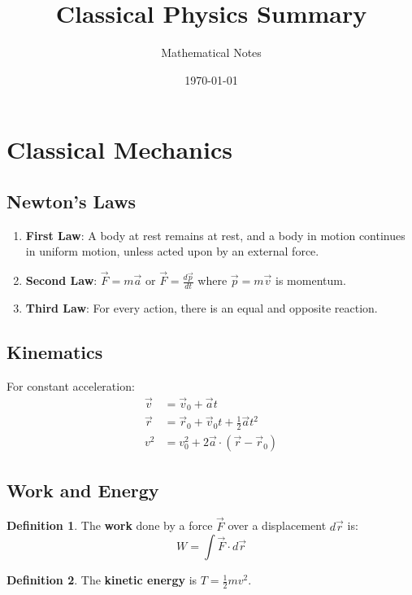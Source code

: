 \documentclass[11pt]{article}
\title{Classical Physics Summary}
\author{Mathematical Notes}
\date{\today}
\theoremstyle{definition}
\newtheorem{definition}{Definition}[section]
\begin{document}
\maketitle

\tableofcontents
\newpage

\section{Classical Mechanics}

\subsection{Newton's Laws}
\begin{enumerate}
    \item \textbf{First Law}: A body at rest remains at rest, and a body in motion continues in uniform motion, unless acted upon by an external force.
    \item \textbf{Second Law}: $\vec{F} = m\vec{a}$ or $\vec{F} = \frac{d\vec{p}}{dt}$ where $\vec{p} = m\vec{v}$ is momentum.
    \item \textbf{Third Law}: For every action, there is an equal and opposite reaction.
\end{enumerate}

\subsection{Kinematics}
For constant acceleration:
\begin{align}
    \vec{v} &= \vec{v}_0 + \vec{a}t \\
    \vec{r} &= \vec{r}_0 + \vec{v}_0 t + \frac{1}{2}\vec{a}t^2 \\
    v^2 &= v_0^2 + 2\vec{a} \cdot (\vec{r} - \vec{r}_0)
\end{align}

\subsection{Work and Energy}
\begin{definition}
The \textbf{work} done by a force $\vec{F}$ over a displacement $d\vec{r}$ is:
$$W = \int \vec{F} \cdot d\vec{r}$$
\end{definition}

\begin{definition}
The \textbf{kinetic energy} is $T = \frac{1}{2}mv^2$.
\end{definition}
\end{document}
